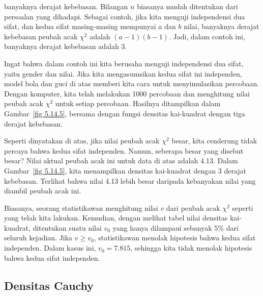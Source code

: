 \begin{example}
banyaknya derajat kebebasan.  Bilangan $n$ biasanya mudah
ditentukan dari persoalan yang dihadapi.  Sebagai contoh, jika kita menguji
independensi dua sifat, dan kedua sifat masing-masing mempunyai $a$ dan $b$ nilai,
banyaknya derajat kebebasan peubah acak $\chi^2$ adalah $(a-1)(b-1)$.  Jadi, dalam
contoh ini, banyaknya derajat kebebasan adalah 3.
\par
Ingat bahwa dalam contoh ini kita berusaha menguji independensi dua sifat, yaitu
gender dan nilai.  Jika kita mengasumsikan kedua sifat ini independen, model bola dan
guci di atas memberi kita cara untuk menyimulasikan percobaan.  Dengan komputer, kita
telah melakukan 1000 percobaan dan menghitung nilai peubah acak $\chi^2$ untuk setiap
percobaan.  Hasilnya ditampilkan dalam Gambar~\ref{fig 5.14.5}, bersama dengan fungsi
densitas kai-kuadrat dengan tiga derajat kebebasan.
\par
Seperti dinyatakan di atas, jika nilai peubah acak $\chi^2$ besar, kita cenderung
tidak percaya bahwa kedua sifat independen.  Namun, seberapa besar yang disebut
besar?  Nilai aktual peubah acak ini untuk data di atas adalah 4.13.  Dalam
Gambar~\ref{fig 5.14.5}, kita menampilkan densitas kai-kuadrat dengan 3 derajat
kebebasan.  Terlihat bahwa nilai 4.13 lebih besar daripada kebanyakan nilai yang
diambil peubah acak ini.

\par
Biasanya, seorang statistikawan menghitung nilai $v$ dari peubah acak $\chi^2$ seperti
yang telah kita lakukan.  Kemudian, dengan melihat tabel nilai densitas kai-kuadrat,
ditentukan suatu nilai $v_0$ yang hanya dilampaui sebanyak 5\% dari seluruh kejadian.
Jika $v \ge v_0$, statistikawan menolak hipotesis bahwa kedua sifat independen.  Dalam
kasus ini, $v_0 = 7.815$, sehingga kita tidak menolak hipotesis bahwa kedua sifat
independen.
\end{example}

\subsection*{Densitas Cauchy}
 
